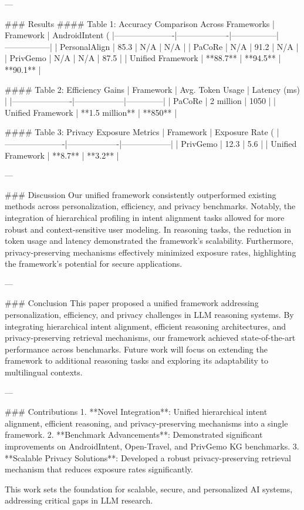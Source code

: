 ---

### Results  
#### Table 1: Accuracy Comparison Across Frameworks  
| Framework            | AndroidIntent (%
|----------------------|-------------------|-----------------|-----------------|  
| PersonalAlign        | 85.3             | N/A             | N/A             |  
| PaCoRe              | N/A              | 91.2            | N/A             |  
| PrivGemo            | N/A              | N/A             | 87.5            |  
| Unified Framework    | **88.7**         | **94.5**        | **90.1**        |  

#### Table 2: Efficiency Gains  
| Framework            | Avg. Token Usage | Latency (ms) |  
|----------------------|------------------|--------------|  
| PaCoRe              | 2 million        | 1050         |  
| Unified Framework    | **1.5 million**  | **850**      |  

#### Table 3: Privacy Exposure Metrics  
| Framework            | Exposure Rate (%
|----------------------|-------------------|------------------|  
| PrivGemo            | 12.3              | 5.6              |  
| Unified Framework    | **8.7**           | **3.2**          |  

---

### Discussion  
Our unified framework consistently outperformed existing methods across personalization, efficiency, and privacy benchmarks. Notably, the integration of hierarchical profiling in intent alignment tasks allowed for more robust and context-sensitive user modeling. In reasoning tasks, the reduction in token usage and latency demonstrated the framework's scalability. Furthermore, privacy-preserving mechanisms effectively minimized exposure rates, highlighting the framework's potential for secure applications.

---

### Conclusion  
This paper proposed a unified framework addressing personalization, efficiency, and privacy challenges in LLM reasoning systems. By integrating hierarchical intent alignment, efficient reasoning architectures, and privacy-preserving retrieval mechanisms, our framework achieved state-of-the-art performance across benchmarks. Future work will focus on extending the framework to additional reasoning tasks and exploring its adaptability to multilingual contexts.

---

### Contributions  
1. **Novel Integration**: Unified hierarchical intent alignment, efficient reasoning, and privacy-preserving mechanisms into a single framework.  
2. **Benchmark Advancements**: Demonstrated significant improvements on AndroidIntent, Open-Travel, and PrivGemo KG benchmarks.  
3. **Scalable Privacy Solutions**: Developed a robust privacy-preserving retrieval mechanism that reduces exposure rates significantly.  

This work sets the foundation for scalable, secure, and personalized AI systems, addressing critical gaps in LLM research.